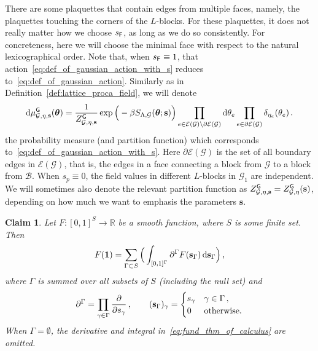 \documentclass[11pt]{article}
\newtheorem{claim}[theorem]{Claim}
\theoremstyle{definition}
\theoremstyle{remark}
\numberwithin{theorem}{section}
\def\Ga{{\Gamma}}
\newcommand{\bR}{\mathbb R}
\newcommand{\cE}{\mathcal{E}}
\newcommand{\cB}{\mathcal B}
\newcommand{\cG}{\mathcal G}
\begin{document}
    There are some plaquettes that contain edges from multiple faces, namely, the plaquettes touching the corners of the $L$-blocks. For these plaquettes, it does not really matter how we choose $s_{\sf F}$, as long as we do so consistently. For concreteness, here we will choose the minimal face with respect to the natural lexicographical order. Note that, when $s_{\sf F} \equiv 1$, that action~\eqref{eq:def_of_gaussian_action_with_s} reduces to~\eqref{eq:def_of_gaussian_action}. Similarly as in Definition~\ref{def:lattice_proca_field}, we will denote 
    \begin{equation*}
        \label{eq:def_of_gaussian_mesure_with_s}
        {\rm d}\mu_{\mathcal{G},\eta,\mathbf{s}}^{\sf G}(\boldsymbol{\theta}) = \frac{1}{Z_{\mathcal{G},\eta,\mathbf{s}}^{\sf G}} \exp\Big( - \beta S_{\Lambda,\mathcal{G}}(\boldsymbol{\theta};\mathbf{s})\Big) \prod_{e\in \cE(\mathcal{G}) \setminus \partial \cE(\mathcal{G}) } {\rm d} \theta_e \prod_{e\in \partial \cE(\mathcal{G})} \delta_{\eta_e}(\theta_e) \, .    
    \end{equation*}   
    the probability measure (and partition function) which corresponds to~\eqref{eq:def_of_gaussian_action_with_s}. Here $\partial \cE(\mathcal{G})$ is the set of all boundary edges in $\cE(\cG)$, that is, the edges in a face connecting a block from $\cG$ to a block from $\cB$. 
    When $s_p \equiv 0$, the field values in different $L$-blocks in $\mathcal{G}_1$ are independent. We will sometimes also denote the relevant partition function as $Z_{\mathcal{G},\eta,\mathbf{s}}^{\sf G} = Z_{\mathcal{G},\eta}^{\sf G}(\mathbf{s})$, depending on how much we want to emphasis the parameters $\mathbf{s}$. 
    \begin{claim}
        \label{claim:fund_thm_of_calculus}
        Let $F: [0,1]^{S} \to \bR$ be a smooth function, where $S$ is some finite set. Then
        \begin{equation}\label{eq:fund_thm_of_calculus}
          F(\mathbf{1}) = \sum_{\Ga\subset S} \Big(\int_{[0,1]^{\Ga}} \partial^\Ga  F(\mathbf{s}_{\Ga}) \, {\rm d} \mathbf{s}_{\Ga} \Big) \, ,
        \end{equation}
        where $\Ga$ is summed over all subsets of $S$ (including the null set) and 
        \[
        \partial^\Ga = \prod_{\gamma\in \Ga} \frac{\partial}{\partial s_\gamma} \,, 
        \qquad (\mathbf{s}_\Ga)_\gamma = \begin{cases}
            s_\gamma & \gamma\in \Ga \, , \\  0 & \text{\normalfont otherwise.}
        \end{cases} 
        \]
        When $\Ga = \emptyset$, the derivative and integral in~\eqref{eq:fund_thm_of_calculus} are omitted. 
    \end{claim}
\end{document}
